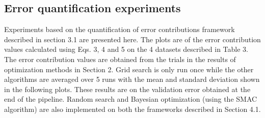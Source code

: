 \subsection{Error quantification experiments}
Experiments based on the quantification of error contributions framework described in section 3.1 are presented here. The plots are of the error contribution values calculated using Eqs. 3, 4 and 5 on the 4 datasets described in Table 3. The error contribution values are obtained from the trials in the results of optimization methods in Section 2. Grid search is only run once while the other algorithms are averaged over 5 runs with the mean and standard deviation shown in the following plots. These results are on the validation error obtained at the end of the pipeline. Random search and Bayesian optimization (using the SMAC algorithm) are also implemented on both the frameworks described in Section 4.1.

